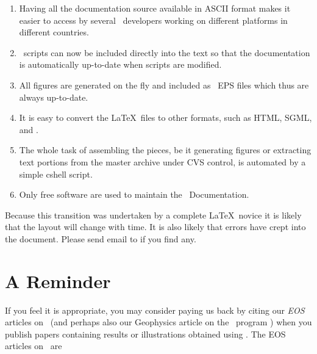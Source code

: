 \begin{enumerate}

\item Having all the documentation source available in
ASCII format makes it easier to access by several
\GMT\ developers working on different platforms in 
different countries.

\item \GMT\ scripts can now be included directly into the text
so that the documentation is automatically up-to-date
when scripts are modified.

\item All figures are generated on the fly and included as
\GMT\ EPS files which thus are always up-to-date.

\item It is easy to convert the \LaTeX\ files to other
formats, such as HTML, SGML, and \PS.

\item The whole task of assembling the pieces, be it generating
figures or extracting text portions from the master archive under
CVS control, is automated by a simple cshell script.

\item Only free software are used to maintain the \GMT\ Documentation.

\end{enumerate}

Because this transition was undertaken by a complete \LaTeX\ novice
it is likely that the layout will change with time.  It is also
likely that errors have crept into the document.  Please send email
to 
if you find any.


\chapter*{A Reminder}

If you feel it is appropriate, you may consider paying us back by
citing our {\it EOS} articles on \GMT\ (and perhaps also our Geophysics
article on the \GMT\ program ) when you publish papers
containing results or illustrations obtained using \GMT.  The EOS
articles on \GMT\ are \\
%
%

